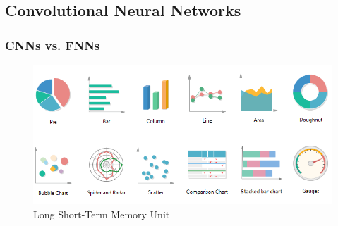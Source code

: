 \documentclass[12pt]{article}
\begin{document}
          

        \subsection{Convolutional Neural Networks}

           \subsubsection{CNNs vs. FNNs}

            \begin{figure}[ht]
            
                \begin{center}

                    \includegraphics[scale=0.5]{types-of-graphs.png}
                    \caption{Long Short-Term Memory Unit \cite{data-basecamp}}
        
                \end{center}
                
            \end{figure}
\end{document}
